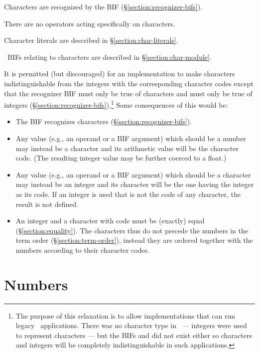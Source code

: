 Characters are recognized by the BIF 
(\S\ref{section:recognizer-bifs}).

There are no operators acting specifically on characters.

Character literals are described in \S\ref{section:char-literals}.

\Erlang\ BIFs relating to characters are described in \S\ref{section:char-module}.

It is permitted (but discouraged) for an implementation to make
characters indistinguishable from the integers with the corresponding
character codes except that the recognizer BIF  must only
be true of characters and  must only be true of
integers (\S\ref{section:recognizer-bifs}).\footnote{The purpose of
this relaxation is to allow implementations that can run legacy
\OldErlang\ applications.  There was no character type in \OldErlang\
--- integers were used to represent characters --- but the BIFs
 and
 did not exist either so characters and integers will
be completely indistinguishable in such applications.} Some
consequences of this would be:
\begin{itemize}
\item The BIF  recognizes characters
(\S\ref{section:recognizer-bifs}).
\item Any value (e.g., an operand or a BIF argument) which should be a
number may instead be a character and its arithmetic value will be the
character code.  (The resulting integer value may be further coerced
to a float.)
\item Any value (e.g., an operand or a BIF argument) which should be a
character may instead be an integer and its character will be the one
having the integer as its code.  If an integer is used that is not the
code of any character, the result is not defined.
\item An integer  and a character with code  must be
(exactly) equal (\S\ref{section:equality}).  The characters thus do
not precede the numbers in the term order
(\S\ref{section:term-order}), instead they are ordered together with
the numbers according to their character codes.
\end{itemize}
\fi

\section{Numbers}

